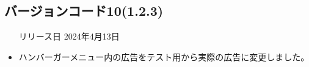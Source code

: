 \subsection*{バージョンコード10(1.2.3)}
\begin{itemize}
    \item[リリース日] 2024年4月13日
\end{itemize}

\new \par
\change
\begin{itemize}
    \item ハンバーガーメニュー内の広告をテスト用から実際の広告に変更しました。
\end{itemize}

\fix
